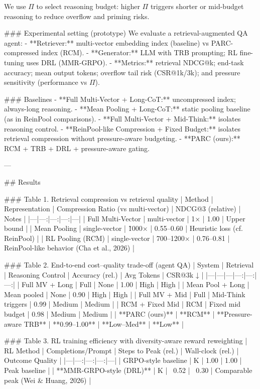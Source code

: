 We use \( \Pi \) to select reasoning budget: higher \( \Pi \) triggers shorter or mid-budget reasoning to reduce overflow and priming risks.

### Experimental setting (prototype)  
We evaluate a retrieval-augmented QA agent:
- **Retriever:** multi-vector embedding index (baseline) vs PARC-compressed index (RCM).  
- **Generator:** LLM with TRB prompting; RL fine-tuning uses DRL (MMR-GRPO).  
- **Metrics:** retrieval NDCG@k; end-task accuracy; mean output tokens; overflow tail risk (CSR@1k/3k); and pressure sensitivity (performance vs \( \Pi \)).

### Baselines  
- **Full Multi-Vector + Long-CoT:** uncompressed index; always-long reasoning.  
- **Mean Pooling + Long-CoT:** static pooling baseline (as in ReinPool comparisons).  
- **Full Multi-Vector + Mid-Think:** isolates reasoning control.  
- **ReinPool-like Compression + Fixed Budget:** isolates retrieval compression without pressure-aware budgeting.  
- **PARC (ours):** RCM + TRB + DRL + pressure-aware gating.

---

## Results  

### Table 1. Retrieval compression vs retrieval quality  
| Method | Representation | Compression Ratio (vs multi-vector) | NDCG@3 (relative) | Notes |
|---|---:|---:|---:|---|
| Full Multi-Vector | multi-vector | 1× | 1.00 | Upper bound |
| Mean Pooling | single-vector | \~1000× | 0.55–0.60 | Heuristic loss (cf. ReinPool) |
| RL Pooling (RCM) | single-vector | 700–1200× | 0.76–0.81 | ReinPool-like behavior (Cha et al., 2026) |

### Table 2. End-to-end cost–quality trade-off (agent QA)  
| System | Retrieval | Reasoning Control | Accuracy (rel.) | Avg Tokens | CSR@3k ↓ |
|---|---|---|---:|---:|---:|
| Full MV + Long | Full | None | 1.00 | High | High |
| Mean Pool + Long | Mean pooled | None | 0.90 | High | High |
| Full MV + Mid | Full | Mid-Think triggers | 0.99 | Medium | Medium |
| RCM + Fixed Mid | RCM | Fixed mid budget | 0.98 | Medium | Medium |
| **PARC (ours)** | **RCM** | **Pressure-aware TRB** | **0.99–1.00** | **Low–Med** | **Low** |

### Table 3. RL training efficiency with diversity-aware reward reweighting  
| RL Method | Completions/Prompt | Steps to Peak (rel.) | Wall-clock (rel.) | Outcome Quality |
|---|---:|---:|---:|---|
| GRPO-style baseline | K | 1.00 | 1.00 | Peak baseline |
| **MMR-GRPO-style (DRL)** | K | ~0.52 | ~0.30 | Comparable peak (Wei & Huang, 2026) |

